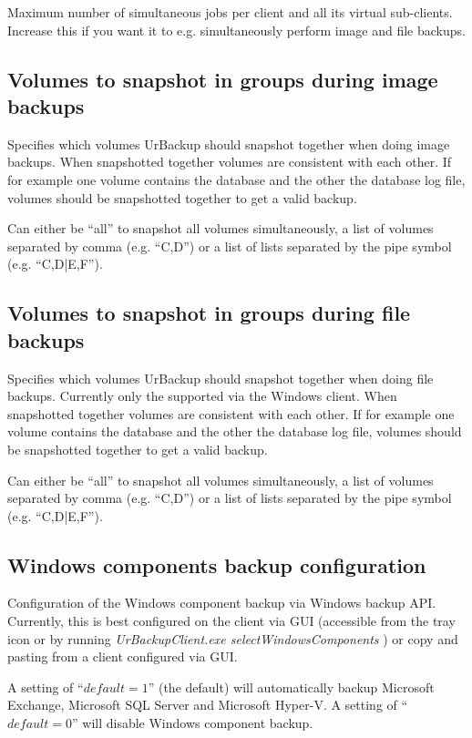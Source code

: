 \documentclass[a4paper,10pt]{article}
\begin{document}
Maximum number of simultaneous jobs per client and all its virtual sub-clients. Increase this if you want it to e.g. simultaneously perform image and file backups.

\subsection{Volumes to snapshot in groups during image backups}

Specifies which volumes UrBackup should snapshot together when doing image backups. When snapshotted together
volumes are consistent with each other. If for example one volume contains the database and the other the database log file, volumes should be snapshotted together to get a valid backup.

Can either be ``all'' to snapshot all volumes simultaneously, a list of volumes separated by comma (e.g. ``C,D'') or a list of lists separated by the pipe symbol (e.g. ``C,D|E,F'').

\subsection{Volumes to snapshot in groups during file backups}

Specifies which volumes UrBackup should snapshot together when doing file backups. Currently only the supported via the Windows client. When snapshotted together
volumes are consistent with each other. If for example one volume contains the database and the other the database log file, volumes should be snapshotted together to get a valid backup.

Can either be ``all'' to snapshot all volumes simultaneously, a list of volumes separated by comma (e.g. ``C,D'') or a list of lists separated by the pipe symbol (e.g. ``C,D|E,F'').

\subsection{Windows components backup configuration}

Configuration of the Windows component backup via Windows backup API. Currently, this is best configured on the client via GUI (accessible from the tray icon or by running \textsl{UrBackupClient.exe selectWindowsComponents} ) or copy and pasting from a client configured via GUI.

A setting of ``$default=1$'' (the default) will automatically backup Microsoft Exchange, Microsoft SQL Server and Microsoft Hyper-V. A setting of ``$default=0$'' will disable Windows component backup. 
\end{document}
